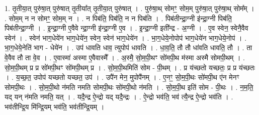 \documentclass[17pt]{extarticle}
\begin{document}
1. तृ॒तीया॒त् पुरु॑षा॒त् पुरु॑षात् तृ॒तीया᳚त् तृ॒तीया॒त् पुरु॑षात् । . पुरु॑षा॒थ् सोमꣳ॒॒ सोम॒म् पुरु॑षा॒त् पुरु॑षा॒थ् सोम᳚म् । . सोम॒म् न न सोमꣳ॒॒ सोम॒म् न । . न पिब॑ति॒ पिब॑ति॒ न न पिब॑ति । . पिब॑तीन्द्रा॒ग्नी इ॑न्द्रा॒ग्नी पिब॑ति॒ पिब॑तीन्द्रा॒ग्नी । . इ॒न्द्रा॒ग्नी ए॒वैवे न्द्रा॒ग्नी इ॑न्द्रा॒ग्नी ए॒व । . इ॒न्द्रा॒ग्नी इती᳚न्द्र - अ॒ग्नी । . ए॒व स्वेन॒ स्वेनै॒वैव स्वेन॑ । . स्वेन॑ भाग॒धेये॑न भाग॒धेये॑न॒ स्वेन॒ स्वेन॑ भाग॒धेये॑न । . भा॒ग॒धेये॒नोपोप॑ भाग॒धेये॑न भाग॒धेये॒नोप॑ । . भा॒ग॒धेये॒नेति॑ भाग - धेये॑न । . उप॑ धावति धाव॒ त्युपोप॑ धावति । . धा॒व॒ति॒ तौ तौ धा॑वति धावति॒ तौ । . ता वे॒वैव तौ ता वे॒व । . ए॒वास्मा॑ अस्मा ए॒वैवास्मै᳚ । . अ॒स्मै॒ सो॒म॒पी॒थꣳ सो॑मपी॒थ म॑स्मा अस्मै सोमपी॒थम् । . सो॒म॒पी॒थम् प्र प्र सो॑मपी॒थꣳ सो॑मपी॒थम् प्र । . सो॒म॒पी॒थमिति॑ सोम - पी॒थम् । . प्र य॑च्छतो यच्छतः॒ प्र प्र य॑च्छतः । . य॒च्छ॒त॒ उपोप॑ यच्छतो यच्छत॒ उप॑ । . उपै॑न मेन॒ मुपोपै॑नम् । . ए॒नꣳ॒॒ सो॒म॒पी॒थः सो॑मपी॒थ ए॑न मेनꣳ सोमपी॒थः । . सो॒म॒पी॒थो न॑मति नमति सोमपी॒थः सो॑मपी॒थो न॑मति । . सो॒म॒पी॒थ इति॑ सोम - पी॒थः । . न॒म॒ति॒ यद् यन् न॑मति नमति॒ यत् । . यदै॒न्द्र ऐ॒न्द्रो यद् यदै॒न्द्रः । . ऐ॒न्द्रो भव॑ति॒ भव॑ त्यै॒न्द्र ऐ॒न्द्रो भव॑ति । . भव॑तीन्द्रि॒य मि॑न्द्रि॒यम् भव॑ति॒ भव॑तीन्द्रि॒यम् । \newline
\end{document}
